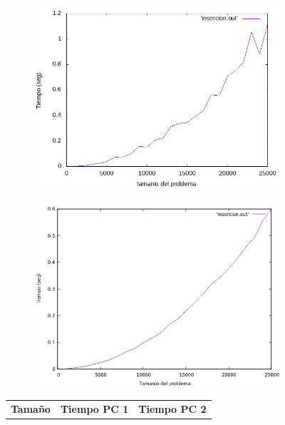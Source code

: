 \documentclass[12pt,spanish]{article}
\begin{document}
\begin{figure}[H]
\centering
\begin{subfigure}[b]{0.45\textwidth}
\includegraphics[scale=0.45]{empirica_insercion.png}
\caption{}
\end{subfigure}
\quad
\begin{subfigure}[b]{0.45\textwidth}
\includegraphics[scale=0.45]{empirica_insercion_2.png}
\caption{}
\end{subfigure}
\newline
\newline
\begin{tabular}{|c|c|c|}
\hline
\textbf{Tamaño} & \textbf{Tiempo PC 1} & \textbf{Tiempo PC 2} \\

\end{tabular}
\end{figure}
\end{document}
